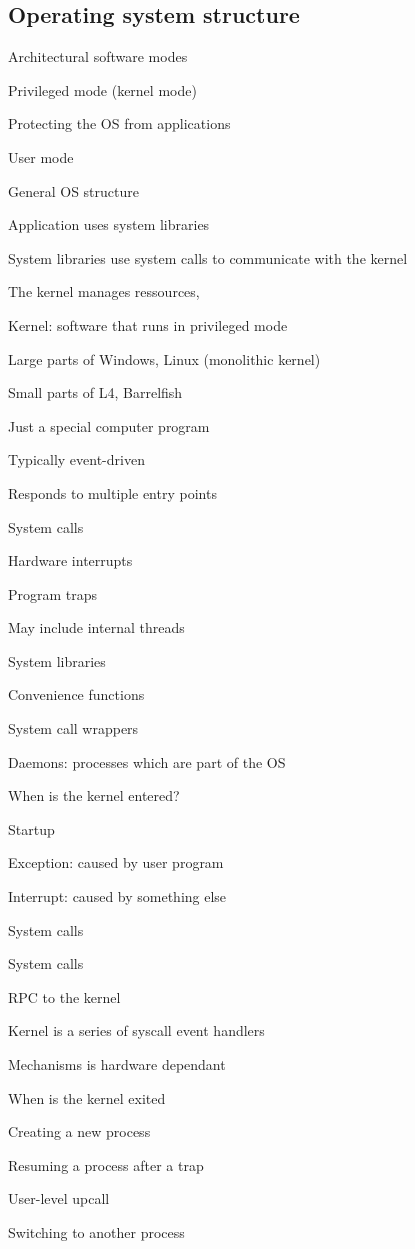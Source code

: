 \subsection{Operating system structure}
\enumstart
	\item Architectural software modes
	\enumstart
		\item Privileged mode (kernel mode)
		\enumstart
			\item Protecting the OS from applications
		\enumend
		\item User mode
	\enumend
	\item General OS structure
	\enumstart
		\item Application uses system libraries
		\item System libraries use system calls to communicate with the kernel
		\item The kernel manages ressources, \ddd
	\enumend
	\item Kernel: software that runs in privileged mode
	\enumstart
		\item Large parts of Windows, Linux (monolithic kernel)
		\item Small parts of L4, Barrelfish
		\item Just a special computer program
		\item Typically event-driven
		\item Responds to multiple entry points
		\enumstart
			\item System calls
			\item Hardware interrupts
			\item Program traps
		\enumend
		\item May include internal threads
	\enumend
	\item System libraries
	\enumstart
		\item Convenience functions
		\item System call wrappers
	\enumend
	\item Daemons: processes which are part of the OS
	\item When is the kernel entered?
	\enumstart
		\item Startup
		\item Exception: caused by user program
		\item Interrupt: caused by something else
		\item System calls
	\enumend
	\item System calls
	\enumstart
		\item RPC to the kernel
		\item Kernel is a series of syscall event handlers
		\item Mechanisms is hardware dependant
	\enumend
	\item When is the kernel exited
	\enumstart
		\item Creating a new process
		\item Resuming a process after a trap
		\item User-level upcall
		\item Switching to another process
	\enumend
\enumend
